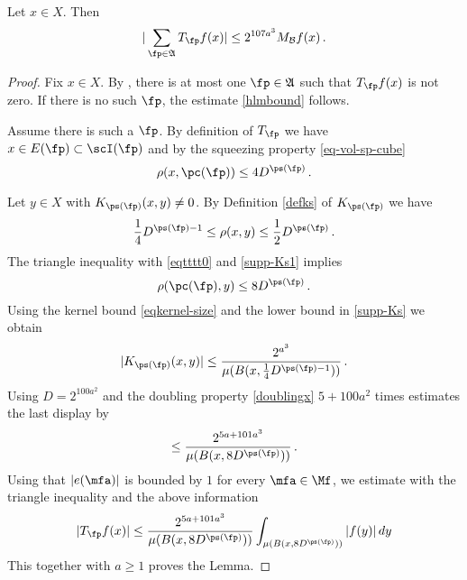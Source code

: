 \begin{lemma}
    \label{maximal-bound-antichain}
    \leanok
    Let $x\in X$.
    Then
    \begin{equation}\label{hlmbound}
    | \sum_{\fp \in \mathfrak{A}}T_{\fp} f(x)|\le 2^{107 a^3} M_{\mathcal{B}} f (x) \, .
    \end{equation}
\end{lemma}

\begin{proof}
Fix $x\in X$. By , there is at most one $\fp \in \mathfrak{A}$
such that
 $T_{\fp} f(x)$ is not zero.
 If there is no such $\fp$, the estimate \eqref{hlmbound} follows.

 Assume there is such a $\fp$.
 By definition of $T_{\fp}$ we have $x\in E(\fp)\subset \scI(\fp)$ and by the squeezing property \eqref{eq-vol-sp-cube}
\begin{equation}\label{eqtttt0}
    \rho(x, \pc(\fp))\le 4D^{\ps(\fp)}\, .
\end{equation}

Let $y\in X$ with $K_{\ps(\fp)}(x,y)\neq 0$. By Definition \eqref{defks} of $K_{\ps(\fp)}$
we have
\begin{equation}\label{supp-Ks1}
   \frac{1}{4} D^{\ps(\fp)-1}
   \leq \rho(x,y) \leq \frac{1}{2} D^{\ps(\fp)}\, .
\end{equation}
The triangle inequality with \eqref{eqtttt0} and \eqref{supp-Ks1} implies
\begin{equation}
    \rho(\pc(\fp),y)\le 8D^{\ps(\fp)}\, .
\end{equation}
Using the kernel bound \eqref{eqkernel-size} and the lower bound in \eqref{supp-Ks}
we obtain
\begin{equation}
|K_{\ps(\fp)}(x,y)|\le \frac{2^{a^3}}{\mu(B(x,\frac 14 D^{{\ps(\fp)}-1}))}\, .
\end{equation}
Using $D=2^{100a^2}$
and the doubling property \eqref{doublingx} $5 +100a^2$ times estimates
the last display by
\begin{equation}
\le \frac{2^{5a+101a^3}}{\mu(B(x, 8D^{\ps(\fp)}))}\, .
\end{equation}
 Using that {$|e(\mfa)|$} is bounded by $1$
for every $\mfa\in \Mf$, we estimate with the triangle inequality and the above information
 \begin{equation}
  | T_{\fp} f(x)|
    \le \frac{2^{5a+101 a^3}}{\mu(B(x, 8D^{\ps(\fp)}))} \int _{\mu(B(x, 8D^{\ps(\fp)}))} |f(y)|\, dy
  \end{equation}
This together with $a\ge 1$ proves the Lemma.
\end{proof}

